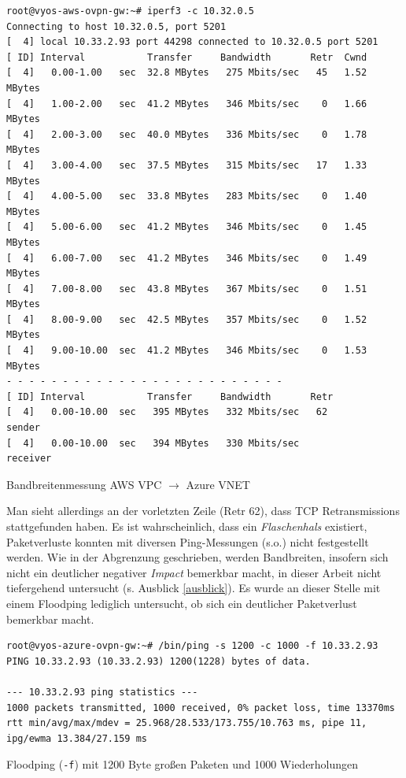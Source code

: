 \begin{listing}[h]
\begin{verbatim}
root@vyos-aws-ovpn-gw:~# iperf3 -c 10.32.0.5
Connecting to host 10.32.0.5, port 5201
[  4] local 10.33.2.93 port 44298 connected to 10.32.0.5 port 5201
[ ID] Interval           Transfer     Bandwidth       Retr  Cwnd
[  4]   0.00-1.00   sec  32.8 MBytes   275 Mbits/sec   45   1.52 MBytes
[  4]   1.00-2.00   sec  41.2 MBytes   346 Mbits/sec    0   1.66 MBytes
[  4]   2.00-3.00   sec  40.0 MBytes   336 Mbits/sec    0   1.78 MBytes
[  4]   3.00-4.00   sec  37.5 MBytes   315 Mbits/sec   17   1.33 MBytes
[  4]   4.00-5.00   sec  33.8 MBytes   283 Mbits/sec    0   1.40 MBytes
[  4]   5.00-6.00   sec  41.2 MBytes   346 Mbits/sec    0   1.45 MBytes
[  4]   6.00-7.00   sec  41.2 MBytes   346 Mbits/sec    0   1.49 MBytes
[  4]   7.00-8.00   sec  43.8 MBytes   367 Mbits/sec    0   1.51 MBytes
[  4]   8.00-9.00   sec  42.5 MBytes   357 Mbits/sec    0   1.52 MBytes
[  4]   9.00-10.00  sec  41.2 MBytes   346 Mbits/sec    0   1.53 MBytes
- - - - - - - - - - - - - - - - - - - - - - - - -
[ ID] Interval           Transfer     Bandwidth       Retr
[  4]   0.00-10.00  sec   395 MBytes   332 Mbits/sec   62             sender
[  4]   0.00-10.00  sec   394 MBytes   330 Mbits/sec                  receiver
\end{verbatim}
\caption{Bandbreitenmessung AWS VPC $\rightarrow$ Azure VNET}
\label{iperf3-vpc-vnet}
\end{listing}\FloatBarrier
Man sieht allerdings an der vorletzten Zeile (\glqq Retr 62\grqq{}), dass TCP Retransmissions stattgefunden haben. Es ist wahrscheinlich, dass ein \textit{Flaschenhals} existiert, Paketverluste konnten mit diversen Ping-Messungen (s.o.) nicht festgestellt werden. Wie in der Abgrenzung geschrieben, werden Bandbreiten, insofern sich nicht ein deutlicher negativer \textit{Impact} bemerkbar macht, in dieser Arbeit nicht tiefergehend untersucht (s. Ausblick \ref{ausblick}). Es wurde an dieser Stelle mit einem Floodping lediglich untersucht, ob sich ein deutlicher Paketverlust bemerkbar macht.
\begin{listing}[h]
\begin{verbatim}
root@vyos-azure-ovpn-gw:~# /bin/ping -s 1200 -c 1000 -f 10.33.2.93
PING 10.33.2.93 (10.33.2.93) 1200(1228) bytes of data.

--- 10.33.2.93 ping statistics ---
1000 packets transmitted, 1000 received, 0% packet loss, time 13370ms
rtt min/avg/max/mdev = 25.968/28.533/173.755/10.763 ms, pipe 11, ipg/ewma 13.384/27.159 ms
\end{verbatim}
\caption{Floodping (\texttt{-f}) mit 1200 Byte großen Paketen und 1000 Wiederholungen}
\label{floodping}
\end{listing}\FloatBarrier

